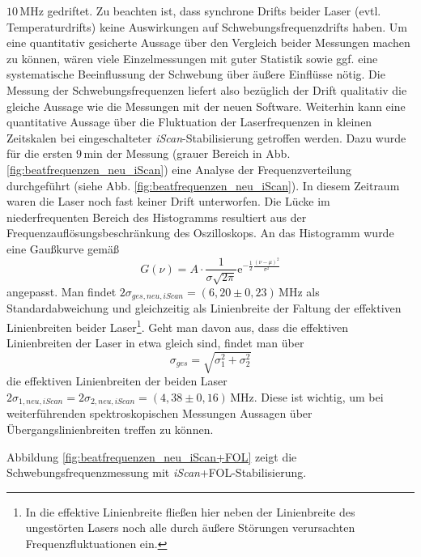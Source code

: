 $10\,$MHz gedriftet. Zu beachten ist, dass synchrone Drifts beider Laser (evtl.
Temperaturdrifts) keine Auswirkungen auf Schwebungsfrequenzdrifts haben. Um eine
quantitativ gesicherte Aussage über den Vergleich beider Messungen machen zu
können, wären viele Einzelmessungen mit guter Statistik sowie ggf. eine
systematische Beeinflussung der Schwebung über äußere Einflüsse nötig.
Die Messung der Schwebungsfrequenzen liefert also bezüglich der Drift qualitativ die gleiche
Aussage wie die Messungen mit der neuen Software. Weiterhin kann eine quantitative Aussage über die Fluktuation
der Laserfrequenzen in kleinen Zeitskalen bei eingeschalteter
\textit{iScan}-Stabilisierung getroffen werden. Dazu wurde für die ersten
$9\,$min der Messung (grauer Bereich in Abb.
\ref{fig:beatfrequenzen_neu_iScan})
eine Analyse der Frequenzverteilung durchgeführt (siehe Abb.
\ref{fig:beatfrequenzen_neu_iScan}).
In diesem Zeitraum waren die Laser noch fast keiner Drift unterworfen. Die Lücke
im niederfrequenten Bereich des Histogramms resultiert aus der
Frequenzauflösungsbeschränkung des Oszilloskops. An das Histogramm wurde eine
Gaußkurve gemäß
\begin{equation}\label{eq:schwebungsfrequenzen_gauss}
	G(\nu)=A\cdot\frac{1}{\sigma\sqrt{2\pi}}\mathrm{e}^{-\frac{1}{2}\frac{(\nu-\mu)^2}{\sigma^2}}
\end{equation}
angepasst. Man findet $2\sigma_{ges,neu,iScan}=(6,20\pm0,23)\,$MHz als
Standardabweichung und gleichzeitig als Linienbreite der Faltung der effektiven Linienbreiten beider
Laser\footnote{In die effektive Linienbreite fließen hier neben der Linienbreite
des ungestörten Lasers noch alle durch äußere Störungen verursachten
Frequenzfluktuationen ein.}. Geht man davon aus, dass die effektiven
Linienbreiten der Laser in etwa gleich sind, findet man über
\begin{equation}\label{eq:schwebungsfrequenzen_linienbreite}
	\sigma_{ges}=\sqrt{\sigma_1^2+\sigma_2^2}
\end{equation}
die effektiven Linienbreiten der beiden Laser
$2\sigma_{1,neu,iScan}=2\sigma_{2,neu,iScan}=(4,38\pm0,16)\,$MHz. Diese ist
wichtig, um bei weiterführenden spektroskopischen Messungen Aussagen über
Übergangslinienbreiten treffen zu können.\par
Abbildung \ref{fig:beatfrequenzen_neu_iScan+FOL} zeigt die
Schwebungsfrequenzmessung mit \textit{iScan}+FOL-Stabilisierung.
